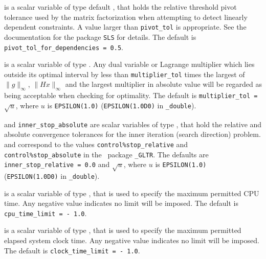 \begin{description}
 is a scalar variable of type default
\realdp, that holds the relative
threshold pivot  tolerance used by the matrix factorization when
attempting to detect linearly dependent constraints. A value larger
than  {\tt pivot\_tol} is appropriate. See
the documentation for the package {\tt SLS} for details.
The default is {\tt pivot\_tol\_for\_dependencies = 0.5}.


 is a scalar variable of type \realdp.
Any dual variable or Lagrange multiplier which lies outside its
optimal interval by less than {\tt multiplier\_tol} times the largest
of $\|g\|_{\infty}$, $\|H x\|_{\infty}$ and the largest multiplier in
absolute value will be regarded
as being acceptable when checking for optimality.
The default is {\tt multiplier\_tol =} $\sqrt{u}$,
where $u$ is {\tt EPSILON(1.0)} ({\tt EPSILON(1.0D0)} in
{\tt \fullpackagename\_dou\-ble}).

 and {\tt inner\_stop\_absolute}
are scalar variables of type \realdp,
that hold the relative and absolute convergence tolerances for the
inner iteration (search direction) problem.
and correspond to the values {\tt control\%stop\_relative} and
{\tt control\%stop\_absolute} in the \galahad\ package
{\tt \libraryname\_GLTR}.
The defaults are {\tt inner\_stop\_relative = 0.0}
and  $\sqrt{u}$,
where $u$ is {\tt EPSILON(1.0)} ({\tt EPSILON(1.0D0)} in
{\tt \fullpackagename\_double}).

 is a scalar variable of type \realdp,
that is used to specify the maximum permitted CPU time. Any negative
value indicates no limit will be imposed. The default is
{\tt cpu\_time\_limit = - 1.0}.

 is a scalar variable of type \realdp,
that is used to specify the maximum permitted elapsed system clock time.
Any negative value indicates no limit will be imposed. The default is
{\tt clock\_time\_limit = - 1.0}.


\end{description}
